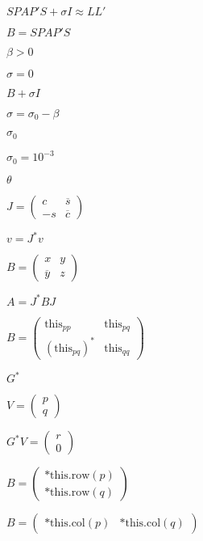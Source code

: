 \documentclass{article}
\begin{document}
$ S P A P' S + \sigma I \approx L L' $
\pagebreak

$ B = S P A P' S $
\pagebreak

$ \beta > 0 $
\pagebreak

$ \sigma = 0 $
\pagebreak

$ B + \sigma I $
\pagebreak

$ \sigma = \sigma_0 - \beta $
\pagebreak

$ \sigma_0 $
\pagebreak

$
\sigma_0 = 10^{-3} $
\pagebreak

$ \theta $
\pagebreak

$ J = \left ( \begin{array}{cc} c & \overline s \\ -s  & \overline c \end{array} \right ) $
\pagebreak

$ v = J^* v $
\pagebreak

$ B = \left ( \begin{array}{cc} x & y \\ \overline y & z \end{array} \right )$
\pagebreak

$ A = J^* B J $
\pagebreak

$ B = \left ( \begin{array}{cc} \text{this}_{pp} & \text{this}_{pq} \\ (\text{this}_{pq})^* &
\text{this}_{qq} \end{array} \right )$
\pagebreak

$ G^* $
\pagebreak

$ V = \left ( \begin{array}{c} p \\ q \end{array} \right )$
\pagebreak

$ G^* V = \left ( \begin{array}{c} r \\ 0 \end{array} \right )$
\pagebreak

$ B = \left ( \begin{array}{cc} \text{*this.row}(p) \\ \text{*this.row}(q) \end{array} \right ) $
\pagebreak

$ B = \left ( \begin{array}{cc} \text{*this.col}(p) & \text{*this.col}(q) \end{array} \right ) $
\pagebreak
\end{document}
